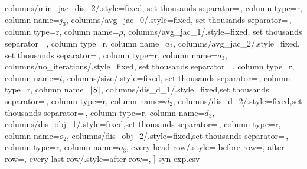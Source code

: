 \begin{table}[t!]
    columns/min_jac_dis_2/.style={fixed, set thousands separator={\,}, column type=r, column name=$j_{3}$}, 
    columns/avg_jac_0/.style={fixed, set thousands separator={\,}, column type=r, column name=$\rho$}, 
    columns/avg_jac_1/.style={fixed, set thousands separator={\,}, column type=r, column name=$a_{2}$}, 
    columns/avg_jac_2/.style={fixed, set thousands separator={\,}, column type=r, column name=$a_{3}$}, 
    columns/no_iterations/.style={fixed, set thousands separator={\,}, column type=r, column name=$i$},
    columns/size/.style={fixed, set thousands separator={\,}, column type=r, column name=${\left|S\right|}$},
    columns/dis_d_1/.style={fixed,set thousands separator={\,}, column type=r, column name=$d_2$},
    columns/dis_d_2/.style={fixed,set thousands separator={\,}, column type=r, column name=$d_3$},
    columns/dis_obj_1/.style={fixed,set thousands separator={\,}, column type=r, column name=$o_2$},
    columns/dis_obj_2/.style={fixed,set thousands separator={\,}, column type=r, column name=$o_3$},
    every head row/.style={
		before row={\toprule},
			after row=\midrule},
    every last row/.style={after row=\bottomrule},
]
{syn-exp.csv}
\end{table}


